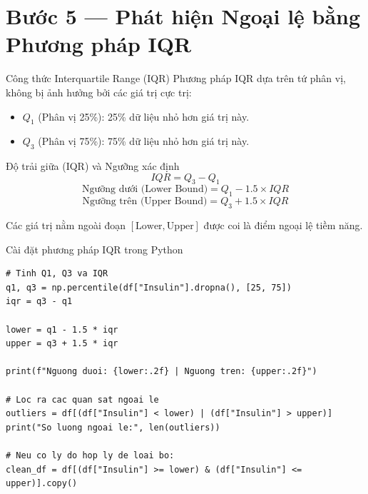 \documentclass[aspectratio=169,11pt]{beamer}
\newcommand{\smallgap}{\vspace{0.35em}}
\begin{document}
\section{Bước 5 — Phát hiện Ngoại lệ bằng Phương pháp IQR}

\begin{frame}{Công thức Interquartile Range (IQR)}
Phương pháp IQR dựa trên tứ phân vị, không bị ảnh hưởng bởi các giá trị cực trị:
\begin{itemize}
  \item $Q_1$ (Phân vị 25\%): 25\% dữ liệu nhỏ hơn giá trị này.
  \item $Q_3$ (Phân vị 75\%): 75\% dữ liệu nhỏ hơn giá trị này.
\end{itemize}

\begin{block}{Độ trải giữa (IQR) và Ngưỡng xác định}
\[
IQR = Q_3 - Q_1
\]
\[
\text{Ngưỡng dưới (Lower Bound)} = Q_1 - 1.5 \times IQR
\]
\[
\text{Ngưỡng trên (Upper Bound)} = Q_3 + 1.5 \times IQR
\]
\end{block}

\smallgap
Các giá trị nằm ngoài đoạn $[\text{Lower}, \text{Upper}]$ được coi là điểm ngoại lệ tiềm năng.
\end{frame}

\begin{frame}[fragile]{Cài đặt phương pháp IQR trong Python}
\begin{lstlisting}[style=pythonstyle]
# Tinh Q1, Q3 va IQR
q1, q3 = np.percentile(df["Insulin"].dropna(), [25, 75])
iqr = q3 - q1

lower = q1 - 1.5 * iqr
upper = q3 + 1.5 * iqr

print(f"Nguong duoi: {lower:.2f} | Nguong tren: {upper:.2f}")

# Loc ra cac quan sat ngoai le
outliers = df[(df["Insulin"] < lower) | (df["Insulin"] > upper)]
print("So luong ngoai le:", len(outliers))

# Neu co ly do hop ly de loai bo:
clean_df = df[(df["Insulin"] >= lower) & (df["Insulin"] <= upper)].copy()
\end{lstlisting}
\end{frame}
\end{document}
